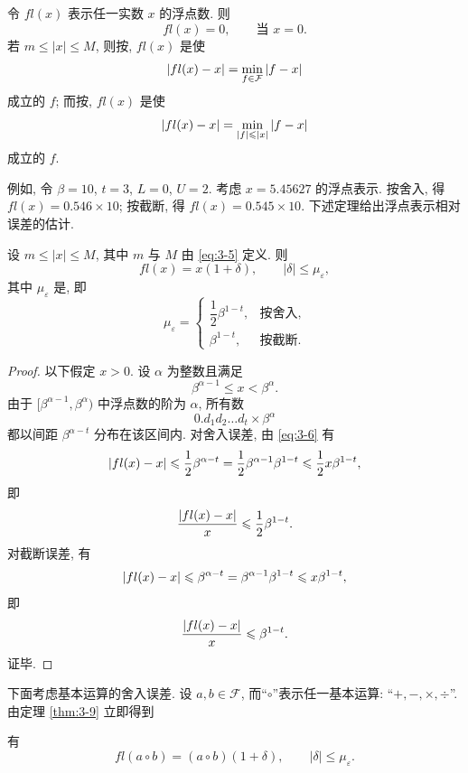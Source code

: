 令 $fl(x)$ 表示任一实数 $x$ 的浮点数. 则
\[
  fl(x)=0,\qquad\text{当 }x=0.
\]
若 $m\leqslant|x|\leqslant M$, 则按, $fl(x)$ 是使
\[
  \left|fl(x)-x\right|=\min_{f\in\mathcal{F}}|f-x|
\]
成立的 $f$; 而按, $fl(x)$ 是使
\[
  \left|fl(x)-x\right|=\min_{|f|\leqslant|x|}|f-x|
\]
成立的 $f$.

例如, 令 $\beta=10$, $t=3$, $L=0$, $U=2$. 考虑 $x=5.45627$ 的浮点表示. 按舍入, 得 $fl(x)=0.546\times10$; 按截断, 得 $fl(x)=0.545\times10$. 下述定理给出浮点表示相对误差的估计.

\begin{theorem}
\label{thm:3-9}
设 $m\leqslant|x|\leqslant M$, 其中 $m$ 与 $M$ 由 \eqref{eq:3-5} 定义. 则
\[
  fl(x)=x(1+\delta),\qquad|\delta|\leqslant\mu_\varepsilon,
\]
其中 $\mu_\varepsilon$ 是, 即
\[
  \mu_\varepsilon=
  \begin{cases}
    \dfrac{1}{2}\beta^{1-t}, & \text{按舍入},\\[8pt]
    \beta^{1-t}, & \text{按截断}.
  \end{cases}
\]
\end{theorem}

\begin{proof}
以下假定 $x>0$. 设 $\alpha$ 为整数且满足
\begin{equation}
  \beta^{\alpha-1}\leqslant x<\beta^{\alpha}.
  \label{eq:3-6}
\end{equation}
由于 $[\beta^{\alpha-1},\beta^{\alpha})$ 中浮点数的阶为 $\alpha$, 所有数
\[
  0.d_1d_2\ldots d_t\times\beta^{\alpha}
\]
都以间距 $\beta^{\alpha-t}$ 分布在该区间内. 对舍入误差, 由 \eqref{eq:3-6} 有
\[
  \left|fl(x)-x\right|\leqslant\frac{1}{2}\beta^{\alpha-t}
  =\frac{1}{2}\beta^{\alpha-1}\beta^{1-t}\leqslant\frac{1}{2}x\beta^{1-t},
\]
即
\[
  \frac{\left|fl(x)-x\right|}{x}\leqslant\frac{1}{2}\beta^{1-t}.
\]
对截断误差, 有
\[
  \left|fl(x)-x\right|\leqslant\beta^{\alpha-t}=\beta^{\alpha-1}\beta^{1-t}\leqslant x\beta^{1-t},
\]
即
\[
  \frac{\left|fl(x)-x\right|}{x}\leqslant\beta^{1-t}.
\]
证毕.
\end{proof}

下面考虑基本运算的舍入误差. 设 $a,b\in\mathcal{F}$, 而``$\circ$''表示任一基本运算: ``$+,-,\times,\div$''. 由定理 \ref{thm:3-9} 立即得到

\begin{theorem}
\label{thm:3-10}
有
\[
  fl(a\circ b)=(a\circ b)(1+\delta),\qquad|\delta|\leqslant\mu_\varepsilon.
\]
\end{theorem}


